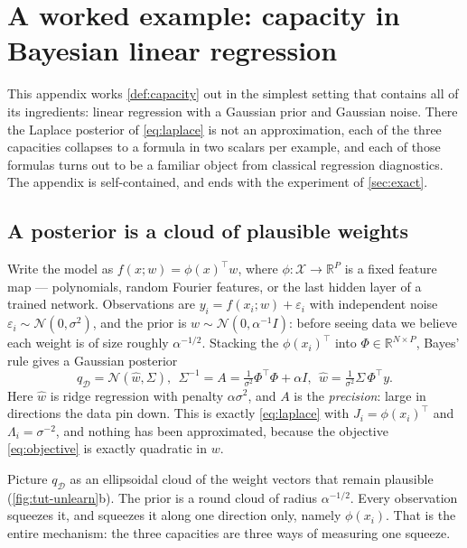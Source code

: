\documentclass[10pt,twocolumn,letterpaper]{article}
\theoremstyle{definition}
\newcommand{\N}{\mathcal{N}}
\newcommand{\D}{\mathcal{D}}
\newcommand{\T}{^{\top}}
\begin{document}
\appendix
\section{A worked example: capacity in Bayesian linear regression}\label{app:tutorial}

This appendix works \cref{def:capacity} out in the simplest setting that contains all of its ingredients: linear regression with a Gaussian prior and Gaussian noise. There the Laplace posterior of \cref{eq:laplace} is not an approximation, each of the three capacities collapses to a formula in two scalars per example, and each of those formulas turns out to be a familiar object from classical regression diagnostics. The appendix is self-contained, and ends with the experiment of \cref{sec:exact}.

\subsection{A posterior is a cloud of plausible weights}
Write the model as $f(x;w)=\phi(x)\T w$, where $\phi:\mathcal{X}\to\mathbb{R}^P$ is a fixed feature map --- polynomials, random Fourier features, or the last hidden layer of a trained network. Observations are $y_i=f(x_i;w)+\varepsilon_i$ with independent noise $\varepsilon_i\sim\N(0,\sigma^2)$, and the prior is $w\sim\N(0,\alpha^{-1}I)$: before seeing data we believe each weight is of size roughly $\alpha^{-1/2}$. Stacking the $\phi(x_i)\T$ into $\Phi\in\mathbb{R}^{N\times P}$, Bayes' rule gives a Gaussian posterior
\begin{equation}
q_\D=\N(\hat w,\Sigma),\ \ \Sigma^{-1}=A=\tfrac{1}{\sigma^2}\Phi\T\Phi+\alpha I,\ \ \hat w=\tfrac{1}{\sigma^2}\Sigma\,\Phi\T y.
\label{eq:tut-post}
\end{equation}
Here $\hat w$ is ridge regression with penalty $\alpha\sigma^2$, and $A$ is the \emph{precision}: large in directions the data pin down. This is exactly \cref{eq:laplace} with $J_i=\phi(x_i)\T$ and $\Lambda_i=\sigma^{-2}$, and nothing has been approximated, because the objective \cref{eq:objective} is exactly quadratic in $w$.

Picture $q_\D$ as an ellipsoidal cloud of the weight vectors that remain plausible (\cref{fig:tut-unlearn}b). The prior is a round cloud of radius $\alpha^{-1/2}$. Every observation squeezes it, and squeezes it along one direction only, namely $\phi(x_i)$. That is the entire mechanism: the three capacities are three ways of measuring one squeeze.
\end{document}
